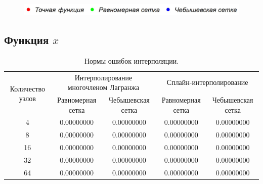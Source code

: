 \documentclass[12pt, a4paper]{article}
\begin{document}
	\begin{figure}[H]
		\includegraphics[width=\textwidth]{labels}
	\end{figure}
	
	
	\subsection{Функция $x$}
	
	\begin{table}[H]
		\caption{Нормы ошибок интерполяции.}
		\centering
		\footnotesize
		\begin{tabular}{|c|c|c|c|c|}
			\hline
			\multirow{2}{5em}{Количество узлов} & \multicolumn{2}{|c|}{Интерполирование многочленом Лагранжа}&\multicolumn{2}{|c|}{Сплайн-интерполирование}\\
			\cline{2-5}
			&Равномерная сетка &Чебышевская сетка &Равномерная сетка&Чебышевская сетка\\
			\hline
			4& 0.00000000&0.00000000&0.00000000&0.00000000\\
			\hline
			8&0.00000000&0.00000000&0.00000000&0.00000000\\
			\hline
			16&0.00000000&0.00000000&0.00000000& 0.00000000\\
			\hline
			32&0.00000000&0.00000000&0.00000000&0.00000000\\
			\hline
			64&0.00000000&0.00000000&0.00000000&0.00000000\\
			\hline
		\end{tabular}
	\end{table}
	
\end{document}
